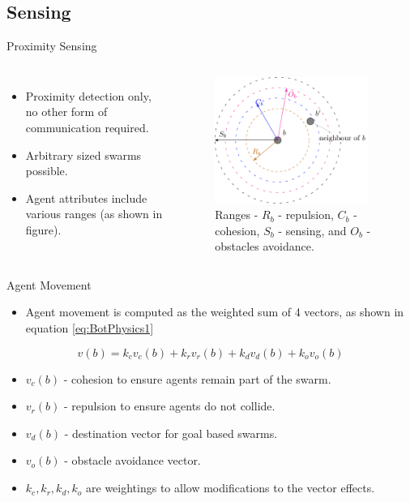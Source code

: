 \documentclass{beamer}
\begin{document}
\subsection{Sensing}

\begin{frame}{Proximity Sensing}
  \begin{columns}
    \begin{itemize}
      \item {
        Proximity detection only, no other form of communication required.
      }
      \item {   
        Arbitrary sized swarms possible.
      }
      \item {   
        Agent attributes include various ranges (as shown in figure).
      }
    \end{itemize}
      \begin{figure}
        \begin{center}
        \includegraphics[width=5cm]{Proximity.pdf}
        \end{center}
        \caption{Ranges - $R_b$ - repulsion, $C_b$ - cohesion, $S_b$ - sensing, and $O_b$ - obstacles avoidance.}
      \end{figure}
  \end{columns} 
\end{frame}

\begin{frame}{Agent Movement}
  \begin{itemize}
    \item Agent movement is computed as the weighted sum of 4 vectors, as shown in equation \ref{eq:BotPhysics1}
  \end{itemize}
  \begin{equation}\label{eq:BotPhysics1}
    v(b) = k_cv_c(b) + k_rv_r(b) + k_dv_d(b) + k_ov_o(b)
  \end{equation}
  \begin{itemize}
    \item $v_c(b)$ - cohesion to ensure agents remain part of the swarm.
    \item $v_r(b)$ - repulsion to ensure agents do not collide.
    \item $v_d(b)$ - destination vector for goal based swarms.
    \item $v_o(b)$ - obstacle avoidance vector.
    \item $k_c, k_r, k_d, k_o$ are weightings to allow modifications to the vector effects. 
  \end{itemize}
  
\end{frame}
\end{document}
